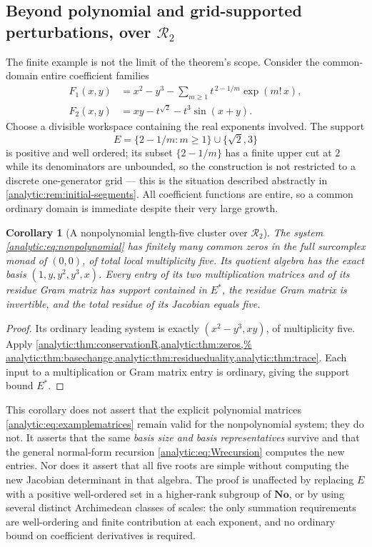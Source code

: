 \documentclass[11pt,letterpaper]{article}
\newtheorem{corollary}[theorem]{Corollary}
\theoremstyle{definition}
\theoremstyle{remark}
\newcommand{\No}{\mathbf{No}}
\newcommand{\RR}{\mathscr R}
\numberwithin{equation}{section}
\begin{document}
\subsection{Beyond polynomial and grid-supported perturbations, over
$\RR_2$}\label{analytic:subsec:nonpolynomial}
The finite example is not the limit of the theorem's scope. Consider the
common-domain entire coefficient families
\begin{align}\label{analytic:eq:nonpolynomial}
 F_1(x,y)&=x^2-y^3-\sum_{m\ge1}t^{\,2-1/m}\exp(m!\,x),\\
 F_2(x,y)&=xy-t^{\sqrt2}-t^3\sin(x+y).\nonumber
\end{align}
Choose a divisible workspace containing the real exponents involved. The
support
\[
 E=\{2-1/m:m\ge1\}\cup\{\sqrt2,3\}
\]
is positive and well ordered; its subset $\{2-1/m\}$ has a finite upper cut
at $2$ while its denominators are unbounded, so the construction is not
restricted to a discrete one-generator grid --- this is the situation
described abstractly in \cref{analytic:rem:initial-segments}. All
coefficient functions are entire, so a common ordinary domain is immediate
despite their very large growth.

\begin{corollary}[A nonpolynomial length-five cluster over $\RR_2$]
\label{analytic:cor:nonpolynomial}
The system \eqref{analytic:eq:nonpolynomial} has finitely many common zeros
in the full surcomplex monad of $(0,0)$, of total local multiplicity five.
Its quotient algebra has the exact basis $(1,y,y^2,y^3,x)$. Every entry of
its two multiplication matrices and of its residue Gram matrix has support
contained in $E^*$, the residue Gram matrix is invertible, and the total
residue of its Jacobian equals five.
\end{corollary}
\begin{proof}
Its ordinary leading system is exactly $(x^2-y^3,xy)$, of multiplicity five.
Apply \cref{analytic:thm:conservationR,analytic:thm:zeros,%
analytic:thm:basechange,analytic:thm:residueduality,analytic:thm:trace}.
Each input to a multiplication or Gram matrix entry is ordinary, giving the
support bound $E^*$.
\end{proof}

This corollary does not assert that the explicit polynomial matrices
\eqref{analytic:eq:examplematrices} remain valid for the nonpolynomial
system; they do not. It asserts that the same \emph{basis size and basis
representatives} survive and that the general normal-form recursion
\eqref{analytic:eq:Wrecursion} computes the new entries. Nor does it assert
that all five roots are simple without computing the new Jacobian
determinant in that algebra. The proof is unaffected by replacing $E$ with a
positive well-ordered set in a higher-rank subgroup of $\No$, or by using
several distinct Archimedean classes of scales: the only summation
requirements are well-ordering and finite contribution at each exponent, and
no ordinary bound on coefficient derivatives is required.
\end{document}
